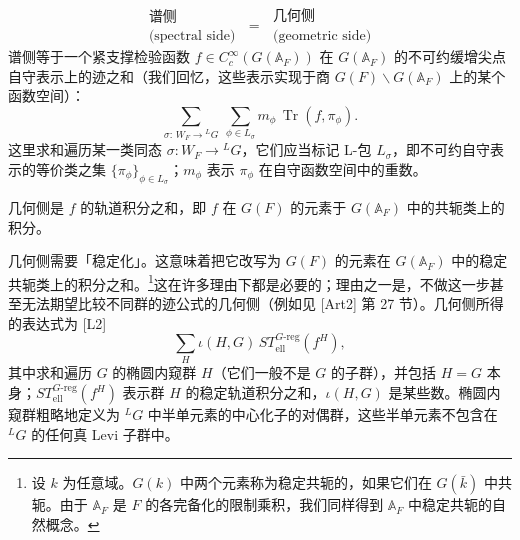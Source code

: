 \begin{equation}\tag{1.2}
\boxed{\begin{smallmatrix}\text{谱侧}\\ \text{(spectral side)}\end{smallmatrix}}
\;=\;
\boxed{\begin{smallmatrix}\text{几何侧}\\ \text{(geometric side)}\end{smallmatrix}}
\end{equation}
谱侧等于一个紧支撑检验函数 $f\in C_c^\infty(G(\mathbb{A}_F))$ 在 $G(\mathbb{A}_F)$ 的不可约缓增尖点自守表示上的迹之和（我们回忆，这些表示实现于商 $G(F)\backslash G(\mathbb{A}_F)$ 上的某个函数空间）：
\begin{equation}\tag{1.3}
\sum_{\sigma:\,W_F\to{}^{L}G}\ \sum_{\phi\in L_\sigma} m_\phi\,\operatorname{Tr}(f,\pi_\phi).
\end{equation}
这里求和遍历某一类同态 $\sigma:W_F\to{}^{L}G$，它们应当标记 L-包 $L_\sigma$，即不可约自守表示的等价类之集 $\{\pi_\phi\}_{\phi\in L_\sigma}$；$m_\phi$ 表示 $\pi_\phi$ 在自守函数空间中的重数。

几何侧是 $f$ 的轨道积分之和，即 $f$ 在 $G(F)$ 的元素于 $G(\mathbb{A}_F)$ 中的共轭类上的积分。

几何侧需要「稳定化」。这意味着把它改写为 $G(F)$ 的元素在 $G(\mathbb{A}_F)$ 中的稳定共轭类上的积分之和。\footnote{设 $k$ 为任意域。$G(k)$ 中两个元素称为稳定共轭的，如果它们在 $G(\bar k)$ 中共轭。由于 $\mathbb{A}_F$ 是 $F$ 的各完备化的限制乘积，我们同样得到 $\mathbb{A}_F$ 中稳定共轭的自然概念。}这在许多理由下都是必要的；理由之一是，不做这一步甚至无法期望比较不同群的迹公式的几何侧（例如见 [Art2] 第 27 节）。几何侧所得的表达式为 [L2]
\begin{equation}\tag{1.4}
\sum_{H}\iota(H,G)\,ST^{G\text{-}\mathrm{reg}}_{\mathrm{ell}}(f^H),
\end{equation}
其中求和遍历 $G$ 的椭圆内窥群 $H$（它们一般不是 $G$ 的子群），并包括 $H=G$ 本身；$ST^{G\text{-}\mathrm{reg}}_{\mathrm{ell}}(f^H)$ 表示群 $H$ 的稳定轨道积分之和，$\iota(H,G)$ 是某些数。椭圆内窥群粗略地定义为 ${}^{L}G$ 中半单元素的中心化子的对偶群，这些半单元素不包含在 ${}^{L}G$ 的任何真 Levi 子群中。


